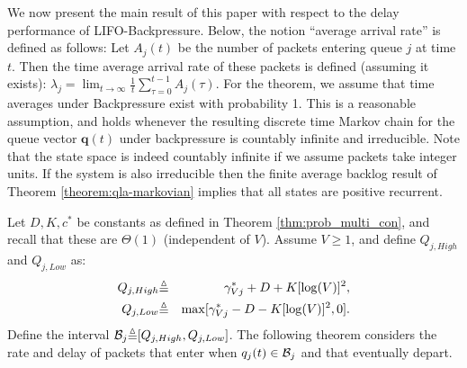 \documentclass[journal]{IEEEtran}
\newcommand{\defequiv}{\mbox{\raisebox{-.3ex}{$\overset{\vartriangle}{=}$}}}
\newcommand{\bv}[1]{{\boldsymbol{#1} }}
\newcommand{\script}[1]{{{\cal{#1} }}}
\begin{document}

We now present the main result of this paper with respect to the delay performance of LIFO-Backpressure. 
Below, the notion ``average arrival rate'' is defined as follows:  Let $A_j(t)$ be the number of packets
entering queue $j$ at time $t$.  Then the time average arrival rate  of these packets is defined (assuming
it exists): 
$\lambda_j = \lim_{t\rightarrow\infty}\frac{1}{t} \sum_{\tau=0}^{t-1}A_j(\tau)$. 
For the theorem, we assume that time averages under Backpressure exist with probability 1. This is a reasonable assumption, and holds whenever the resulting discrete time Markov chain for the queue vector $\bv{q}(t)$ under backpressure is countably infinite and irreducible.  Note that the 
state space is indeed countably infinite if we assume packets take integer units.  If the system is also irreducible then the finite average backlog 
result of Theorem \ref{theorem:qla-markovian} implies that all states are positive recurrent. 

Let $D, K, c^*$ be constants as defined in Theorem \ref{thm:prob_multi_con}, and 
recall that these are $\Theta(1)$ (independent of $V$). 
Assume $V\geq1$, and define $Q_{j, High}$ and $Q_{j, Low}$ as: 
\begin{eqnarray*}
Q_{j, High} &\defequiv&  \gamma_{V j}^* + D + K[\log(V)]^2, \\
Q_{j, Low} &\defequiv& \max[\gamma_{V j}^* - D - K[\log(V)]^2, 0]. 
\end{eqnarray*}
Define the interval 
$\script{B}_j \defequiv [Q_{j, High}, Q_{j, Low}]$.  The following theorem considers
the rate and delay of packets that enter when $q_j(t) \in \script{B}_j$ and that eventually depart. 
\end{document}
